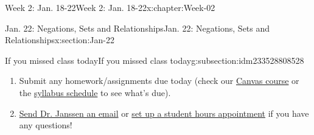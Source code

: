 \documentclass[oneside,10pt,]{book}
\numberwithin{equation}{section}
\begin{document}
\begin{chapterptx}{Week 2: Jan. 18-22}{}{Week 2: Jan. 18-22}{}{}{x:chapter:Week-02}
\begin{sectionptx}{Jan. 22: Negations, Sets and Relationships}{}{Jan. 22: Negations, Sets and Relationships}{}{}{x:section:Jan-22}
\begin{subsectionptx}{If you missed class today}{}{If you missed class today}{}{}{g:subsection:idm233528808528}
\begin{enumerate}
\item{}Submit any homework\slash{}assignments due today (check our \href{https://dordt.instructure.com/courses/3110050}{Canvas course} or the \href{https://prof.mkjanssen.org/ds/index.html\#schedule}{syllabus schedule} to see what's due).%
\item{}\href{mailto:mike.janssen@dordt.edu}{Send Dr. Janssen an email} or \href{https://calendly.com/mkjanssen/student-hours}{set up a student hours appointment} if you have any questions!%
\end{enumerate}
\end{subsectionptx}
\end{sectionptx}
\end{chapterptx}
%
%
\typeout{************************************************}
\typeout{************************************************}
%
\end{document}

